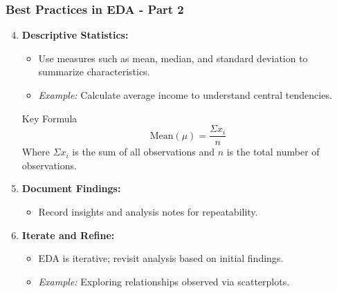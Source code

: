 \documentclass[aspectratio=169]{beamer}
\begin{document}
\begin{frame}[fragile]
    \frametitle{Best Practices in EDA - Part 2}
    \begin{enumerate}
        \setcounter{enumi}{3} %
        \item \textbf{Descriptive Statistics:}
        \begin{itemize}
            \item Use measures such as mean, median, and standard deviation to summarize characteristics.
            \item \textit{Example:} Calculate average income to understand central tendencies.
        \end{itemize}

        \begin{block}{Key Formula}
            \begin{equation}
            \text{Mean} (\mu) = \frac{\Sigma x_i}{n}
            \end{equation}
            Where $\Sigma x_i$ is the sum of all observations and $n$ is the total number of observations.
        \end{block}

        \item \textbf{Document Findings:}
        \begin{itemize}
            \item Record insights and analysis notes for repeatability.
        \end{itemize}

        \item \textbf{Iterate and Refine:}
        \begin{itemize}
            \item EDA is iterative; revisit analysis based on initial findings.
            \item \textit{Example:} Exploring relationships observed via scatterplots.
        \end{itemize}
    \end{enumerate}
\end{frame}
\end{document}
